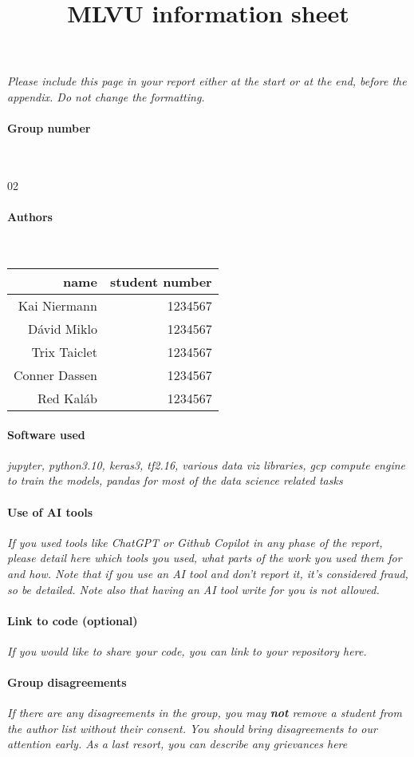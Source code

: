 \title{MLVU information sheet}
\author{}
\date{}
\maketitle

\noindent \textit{Please include this page in your report either at the start or at the end, before the appendix. Do not change the formatting.}

\paragraph{Group number}~

02

\paragraph{Authors}~

\begin{tabular}{r r}
name &student number \\
\hline
Kai Niermann & 1234567 \\
Dávid Miklo & 1234567 \\
Trix Taiclet & 1234567 \\
Conner Dassen & 1234567 \\
Red Kaláb & 1234567 \\
\end{tabular}

\paragraph{Software used} \textit{jupyter, python3.10, keras3, tf2.16, various data viz libraries, gcp compute engine to train the models, pandas for most of the data science related tasks}

\paragraph{Use of AI tools} \textit{If you used tools like ChatGPT or Github Copilot in any phase of the report, please detail here which tools you used, what parts of the work you used them for and how. Note that if you use an AI tool and don't report it, it's considered fraud, so be detailed. Note also that having an AI tool write for you is not allowed. }

\paragraph{Link to code (optional)} \textit{If you would like to share your code, you can link to your repository here.}

\paragraph{Group disagreements} \textit{If there are any disagreements in the group, you may \textbf{not} remove a student from the author list without their consent. You should bring disagreements to our attention early. As a last resort, you can describe any grievances here}